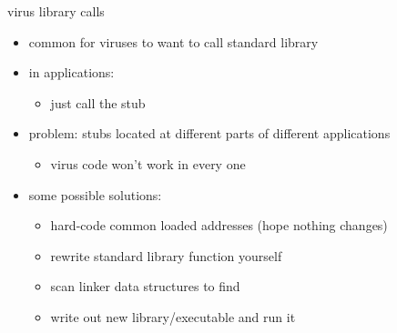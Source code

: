 \begin{frame}{virus library calls}
    \begin{itemize}
    \item common for viruses to want to call standard library
    \vspace{.5cm}
    \item in applications:
        \begin{itemize}
        \item just call the stub
        \end{itemize}
    \item problem: stubs located at different parts of different applications
        \begin{itemize}
        \item virus code won't work in every one
        \end{itemize}
    \item some possible solutions:
        \begin{itemize}
        \item hard-code common loaded addresses (hope nothing changes)
        \item rewrite standard library function yourself
        \item scan linker data structures to find
        \item write out new library/executable and run it
        \end{itemize}
    \end{itemize}
\end{frame}
